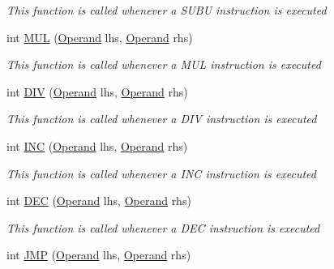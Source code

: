 \begin{DoxyCompactItemize}
\begin{DoxyCompactList}\small\item\em This function is called whenever a S\+U\+B\+U instruction is executed \end{DoxyCompactList}\item 
int \hyperlink{class_c_p_u___o_s___simulator_1_1_c_p_u_1_1_instruction_a46ba0e257c0a23f35b638cc774c016bd}{M\+U\+L} (\hyperlink{class_c_p_u___o_s___simulator_1_1_c_p_u_1_1_operand}{Operand} lhs, \hyperlink{class_c_p_u___o_s___simulator_1_1_c_p_u_1_1_operand}{Operand} rhs)
\begin{DoxyCompactList}\small\item\em This function is called whenever a M\+U\+L instruction is executed \end{DoxyCompactList}\item 
int \hyperlink{class_c_p_u___o_s___simulator_1_1_c_p_u_1_1_instruction_a45a29c12e7b55d4831705d13460df4a1}{D\+I\+V} (\hyperlink{class_c_p_u___o_s___simulator_1_1_c_p_u_1_1_operand}{Operand} lhs, \hyperlink{class_c_p_u___o_s___simulator_1_1_c_p_u_1_1_operand}{Operand} rhs)
\begin{DoxyCompactList}\small\item\em This function is called whenever a D\+I\+V instruction is executed \end{DoxyCompactList}\item 
int \hyperlink{class_c_p_u___o_s___simulator_1_1_c_p_u_1_1_instruction_a1fd4bf15c81941456405fd7a17ab2962}{I\+N\+C} (\hyperlink{class_c_p_u___o_s___simulator_1_1_c_p_u_1_1_operand}{Operand} lhs, \hyperlink{class_c_p_u___o_s___simulator_1_1_c_p_u_1_1_operand}{Operand} rhs)
\begin{DoxyCompactList}\small\item\em This function is called whenever a I\+N\+C instruction is executed \end{DoxyCompactList}\item 
int \hyperlink{class_c_p_u___o_s___simulator_1_1_c_p_u_1_1_instruction_a9cb36212a7cab42725d8a05f719e732f}{D\+E\+C} (\hyperlink{class_c_p_u___o_s___simulator_1_1_c_p_u_1_1_operand}{Operand} lhs, \hyperlink{class_c_p_u___o_s___simulator_1_1_c_p_u_1_1_operand}{Operand} rhs)
\begin{DoxyCompactList}\small\item\em This function is called whenever a D\+E\+C instruction is executed \end{DoxyCompactList}\item 
int \hyperlink{class_c_p_u___o_s___simulator_1_1_c_p_u_1_1_instruction_aa932e1a27222a151a6f9e60454a47e32}{J\+M\+P} (\hyperlink{class_c_p_u___o_s___simulator_1_1_c_p_u_1_1_operand}{Operand} lhs, \hyperlink{class_c_p_u___o_s___simulator_1_1_c_p_u_1_1_operand}{Operand} rhs)

\end{DoxyCompactItemize}
